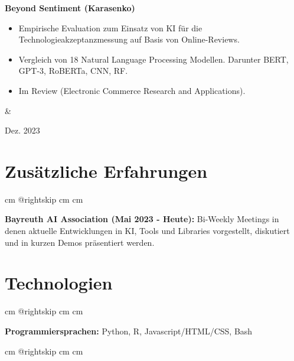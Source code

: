 \documentclass[10pt, a4paper]{article}
\newenvironment{highlights}{
        \begin{itemize}[
                topsep=0pt,
                parsep=0.10 cm,
                partopsep=0pt,
                itemsep=0pt,
                after=\vspace{-1\baselineskip},
                leftmargin=0.4 cm + 3pt
            ]
    }{
        \end{itemize}
    } %
\let\originalTabularx\tabularx
\let\originalEndTabularx\endtabularx
\renewenvironment{tabularx}{\bgroup\centering\originalTabularx}{\originalEndTabularx\par\egroup}
\begin{document}
        \vspace{0.2 cm}
        \begin{tabularx}{
            \textwidth-0.4 cm-0.13cm
        }{
            K{0.2 cm}
            R{4.1 cm}
        }
            \textbf{Beyond Sentiment (Karasenko)}

            \vspace{0.10 cm}

            \begin{highlights}
                \item Empirische Evaluation zum Einsatz von KI für die Technologieakzeptanzmessung auf Basis von Online-Reviews.
                \item Vergleich von 18 Natural Language Processing Modellen. Darunter BERT, GPT-3, RoBERTa, CNN, RF.
                \item Im Review (Electronic Commerce Research and Applications).
            \end{highlights}
            &
            

            Dez. 2023
        \end{tabularx}



    
    \section{Zusätzliche Erfahrungen}

        \begingroup{} cm
        \advance\csname @rightskip cm
        \advance{} cm

        \textbf{Bayreuth AI Association (Mai 2023 - Heute):} Bi-Weekly Meetings in denen aktuelle Entwicklungen in KI, Tools und Libraries vorgestellt, diskutiert und in kurzen Demos präsentiert werden.
        \par\endgroup


    
    \section{Technologien}

        \begingroup{} cm
        \advance\csname @rightskip cm
        \advance{} cm

        \textbf{Programmiersprachen:} Python, R, Javascript/HTML/CSS, Bash
        \par\endgroup

        \vspace{0.2 cm}
        \begingroup{} cm
        \advance\csname @rightskip cm
        \advance{} cm
\end{document}
